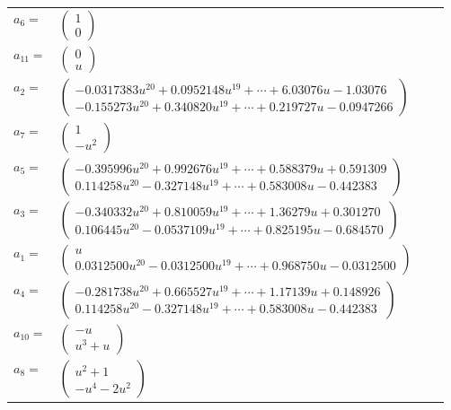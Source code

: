 \documentclass[1p]{elsarticle_modified}
\theoremstyle{definition}
\begin{document}
\begin{tabular}{m{7pt} m{180pt} m{7pt} m{180pt} }
\flushright $a_{6}=$&$\begin{pmatrix}1\\0\end{pmatrix}$ \\
\flushright $a_{11}=$&$\begin{pmatrix}0\\u\end{pmatrix}$ \\
\flushright $a_{2}=$&$\begin{pmatrix}-0.0317383 u^{20}+0.0952148 u^{19}+\cdots+6.03076 u-1.03076\\-0.155273 u^{20}+0.340820 u^{19}+\cdots+0.219727 u-0.0947266\end{pmatrix}$ \\
\flushright $a_{7}=$&$\begin{pmatrix}1\\- u^2\end{pmatrix}$ \\
\flushright $a_{5}=$&$\begin{pmatrix}-0.395996 u^{20}+0.992676 u^{19}+\cdots+0.588379 u+0.591309\\0.114258 u^{20}-0.327148 u^{19}+\cdots+0.583008 u-0.442383\end{pmatrix}$ \\
\flushright $a_{3}=$&$\begin{pmatrix}-0.340332 u^{20}+0.810059 u^{19}+\cdots+1.36279 u+0.301270\\0.106445 u^{20}-0.0537109 u^{19}+\cdots+0.825195 u-0.684570\end{pmatrix}$ \\
\flushright $a_{1}=$&$\begin{pmatrix}u\\0.0312500 u^{20}-0.0312500 u^{19}+\cdots+0.968750 u-0.0312500\end{pmatrix}$ \\
\flushright $a_{4}=$&$\begin{pmatrix}-0.281738 u^{20}+0.665527 u^{19}+\cdots+1.17139 u+0.148926\\0.114258 u^{20}-0.327148 u^{19}+\cdots+0.583008 u-0.442383\end{pmatrix}$ \\
\flushright $a_{10}=$&$\begin{pmatrix}- u\\u^3+u\end{pmatrix}$ \\
\flushright $a_{8}=$&$\begin{pmatrix}u^2+1\\- u^4-2 u^2\end{pmatrix}$ \\

\end{tabular}
\end{document}
